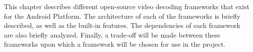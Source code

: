 This chapter describes different open-source video decoding frameworks that exist for the Android Platform. The architecture of each of the frameworks is briefly described, as well as the built-in features. The dependencies of each framework are also briefly analyzed. Finally, a trade-off will be made between these frameworks upon which a framework will be chosen for use in the project.